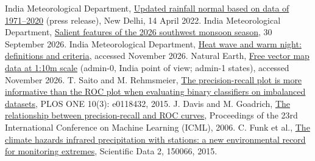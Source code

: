 \documentclass[12pt,a4paper]{report}
\newcommand{\reflink}[2]{\href{#1}{\textcolor{linkblue}{#2}}}
\begin{document}
{\begin{thebibliography}{99}
 India Meteorological Department, \reflink{https://internal.imd.gov.in/press_release/20220414_pr_1572.pdf}{Updated rainfall normal based on data of 1971--2020} (press release), New Delhi, 14 April 2022.
 India Meteorological Department, \reflink{https://mausam.imd.gov.in/Forecast/marquee_data/Salient_Features_SW_MONSOON\%20_2026_30_sep.pdf}{Salient features of the 2026 southwest monsoon season}, 30 September 2026.
 India Meteorological Department, \reflink{https://mausam.imd.gov.in/pdfs/heatcolduser/Definition.pdf}{Heat wave and warm night: definitions and criteria}, accessed November 2026.
 Natural Earth, \reflink{https://www.naturalearthdata.com}{Free vector map data at 1:10m scale} (admin-0, India point of view; admin-1 states), accessed November 2026.
 T. Saito and M. Rehmsmeier, \reflink{https://doi.org/10.1371/journal.pone.0118432}{The precision-recall plot is more informative than the ROC plot when evaluating binary classifiers on imbalanced datasets}, PLOS ONE 10(3): e0118432, 2015.
 J. Davis and M. Goadrich, \reflink{https://doi.org/10.1145/1143844.1143874}{The relationship between precision-recall and ROC curves}, Proceedings of the 23rd International Conference on Machine Learning (ICML), 2006.
 C. Funk et al., \reflink{https://doi.org/10.1038/sdata.2015.66}{The climate hazards infrared precipitation with stations: a new environmental record for monitoring extremes}, Scientific Data 2, 150066, 2015.
\end{thebibliography}}
\end{document}
